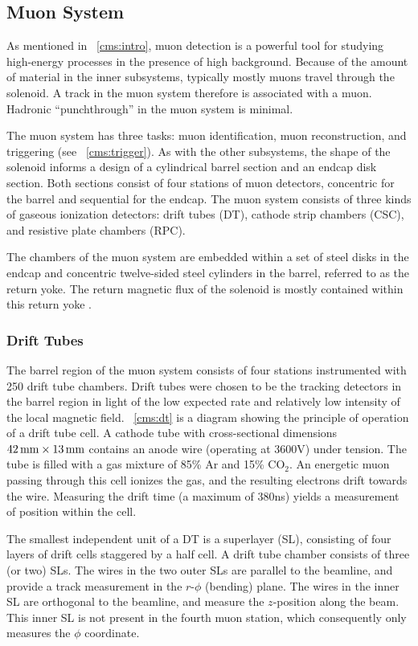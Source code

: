\subsection{Muon System}
As mentioned in \Sec~\ref{cms:intro}, muon detection is a powerful tool for studying high-energy processes in the presence of high background.
Because of the amount of material in the inner subsystems, typically mostly muons travel through the solenoid.
A track in the muon system therefore is associated with a muon.
Hadronic ``punchthrough'' in the muon system is minimal.

The muon system has three tasks: muon identification, muon reconstruction, and triggering (see \Sec~\ref{cms:trigger}).
As with the other subsystems, the shape of the solenoid informs a design of a cylindrical barrel section and an endcap disk section.
Both sections consist of four stations of muon detectors, concentric for the barrel and sequential for the endcap.
The muon system consists of three kinds of gaseous ionization detectors: drift tubes (DT), cathode strip chambers (CSC), and resistive plate chambers (RPC).

The chambers of the muon system are embedded within a set of steel disks in the endcap and concentric twelve-sided steel cylinders in the barrel, referred to as the return yoke.
The return magnetic flux of the solenoid is mostly contained within this return yoke \cite{Chatrchyan:2008zzk, CMS:1997dma}.

\subsubsection{Drift Tubes}
The barrel region of the muon system consists of four stations instrumented with 250 drift tube chambers.
Drift tubes were chosen to be the tracking detectors in the barrel region in light of the low expected rate and relatively low intensity of the local magnetic field.
\Fig~\ref{cms:dt} is a diagram showing the principle of operation of a drift tube cell.
A cathode tube with cross-sectional dimensions $42 \,\text{mm} \times 13 \,\text{mm}$ contains an anode wire (operating at 3600\unit{V}) under tension.
The tube is filled with a gas mixture of 85\% Ar and 15\% CO$_2$.
An energetic muon passing through this cell ionizes the gas, and the resulting electrons drift towards the wire.
Measuring the drift time (a maximum of 380\unit{ns}) yields a measurement of position within the cell.

The smallest independent unit of a DT is a superlayer (SL), consisting of four layers of drift cells staggered by a half cell.
A drift tube chamber consists of three (or two) SLs.
The wires in the two outer SLs are parallel to the beamline, and provide a track measurement in the $r$-$\phi$ (bending) plane.
The wires in the inner SL are orthogonal to the beamline, and measure the $z$-position along the beam.
This inner SL is not present in the fourth muon station, which consequently only measures the $\phi$ coordinate.

